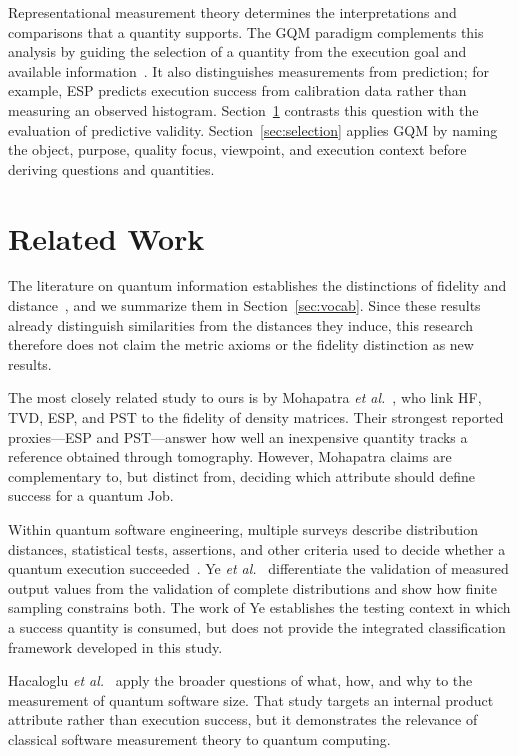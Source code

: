 \documentclass[10pt,conference]{IEEEtran}
\begin{document}
Representational measurement theory determines the interpretations and comparisons that a quantity supports. The GQM paradigm complements this analysis by guiding the selection of a quantity from the execution goal and available information~\cite{basili1994,fentonBieman2015}. It also distinguishes measurements from prediction; for example, ESP predicts execution success from calibration data rather than measuring an observed histogram. Section~\ref{sec:related} contrasts this question with the evaluation of predictive validity. Section~\ref{sec:selection} applies GQM by naming the object, purpose, quality focus, viewpoint, and execution context before deriving questions and quantities.

\section{Related Work}
\label{sec:related}

The literature on quantum information establishes the distinctions of fidelity and distance~\cite{gilchrist2005,luo2004,ma2009,mendonca2008,uhlmann1976,nielsen2010}, and we summarize them in Section~\ref{sec:vocab}. Since these results already distinguish similarities from the distances they induce, this research therefore does not claim the metric axioms or the fidelity distinction as new results.

The most closely related study to ours is by Mohapatra \emph{et al.}~\cite{mohapatra2025}, who link HF, TVD, ESP, and PST to the fidelity of density matrices. Their strongest reported proxies---ESP and PST---answer how well an inexpensive quantity tracks a reference obtained through tomography. However, Mohapatra claims are complementary to, but distinct from, deciding which attribute should define success for a quantum Job.

Within quantum software engineering, multiple surveys describe distribution distances, statistical tests, assertions, and other criteria used to decide whether a quantum execution succeeded~\cite{paltenghi2024,andrews2026,ramalho2025}. Ye \emph{et al.}~\cite{ye2025} differentiate the validation of measured output values from the validation of complete distributions and show how finite sampling constrains both. The work of Ye establishes the testing context in which a success quantity is consumed, but does not provide the integrated classification framework developed in this study.

Hacaloglu \emph{et al.}~\cite{hacaloglu2026} apply the broader questions of what, how, and why to the measurement of quantum software size. That study targets an internal product attribute rather than execution success, but it demonstrates the relevance of classical software measurement theory to quantum computing.
\end{document}
